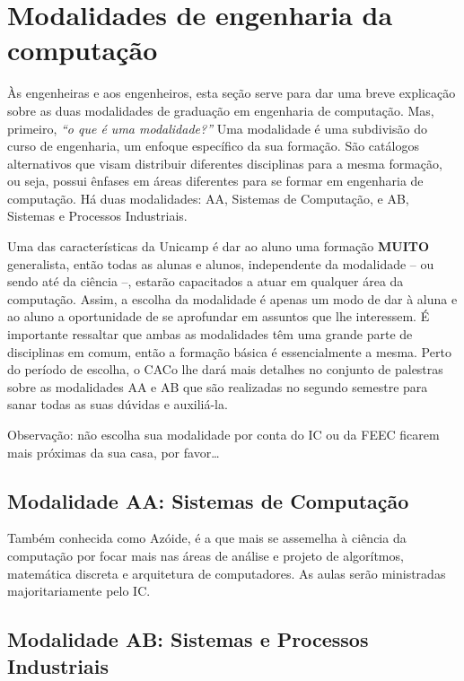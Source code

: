 
\section{Modalidades de engenharia da computação}

Às engenheiras e aos engenheiros, esta seção serve para dar uma breve
explicação sobre as duas modalidades de graduação em engenharia de computação.
Mas, primeiro, {\emph{``o que é uma modalidade?''}} Uma modalidade é uma
subdivisão do curso de engenharia, um enfoque específico da sua formação. São
catálogos alternativos que visam distribuir diferentes disciplinas para a mesma
formação, ou seja, possui ênfases em áreas diferentes para se formar em
engenharia de computação. Há duas modalidades: AA, Sistemas de Computação, e
AB, Sistemas e Processos Industriais.

Uma das características da Unicamp é dar ao aluno uma formação \textbf{MUITO}
generalista, então todas as alunas e alunos, independente da modalidade -- ou
sendo até da ciência --, estarão capacitados a atuar em qualquer área da
computação. Assim, a escolha da modalidade é apenas um modo de dar à aluna e ao
aluno a oportunidade de se aprofundar em assuntos que lhe interessem. É
importante ressaltar que ambas as modalidades têm uma grande parte de
disciplinas em comum, então a formação básica é essencialmente a mesma. Perto
do período de escolha, o CACo lhe dará mais detalhes no conjunto de palestras
sobre as modalidades AA e AB que são realizadas no segundo semestre para sanar
todas as suas dúvidas e auxiliá-la.

Observação: não escolha sua modalidade por conta do IC ou da FEEC ficarem mais
próximas da sua casa, por favor{\dots}

\subsection{Modalidade AA: Sistemas de Computação}

Também conhecida como Azóide, é a que mais se assemelha à ciência da computação
por focar mais nas áreas de análise e projeto de algorítmos, matemática
discreta e arquitetura de computadores. As aulas serão ministradas
majoritariamente pelo IC.

\subsection{Modalidade AB: Sistemas e Processos Industriais}

